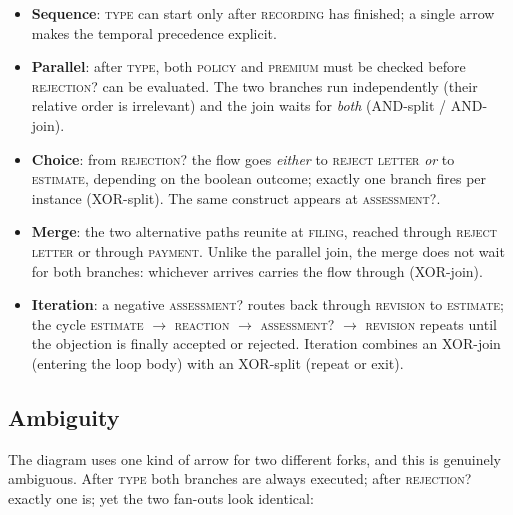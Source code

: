 \begin{itemize}
  \item \textbf{Sequence}: \textsc{type} can start only after \textsc{recording} has finished; a single arrow makes the temporal precedence explicit.
  \item \textbf{Parallel}: after \textsc{type}, both \textsc{policy} and \textsc{premium} must be checked before \textsc{rejection?} can be evaluated. The two branches run independently (their relative order is irrelevant) and the join waits for \emph{both} (AND-split / AND-join).
  \item \textbf{Choice}: from \textsc{rejection?} the flow goes \emph{either} to \textsc{reject letter} \emph{or} to \textsc{estimate}, depending on the boolean outcome; exactly one branch fires per instance (XOR-split). The same construct appears at \textsc{assessment?}.
  \item \textbf{Merge}: the two alternative paths reunite at \textsc{filing}, reached through \textsc{reject letter} or through \textsc{payment}. Unlike the parallel join, the merge does not wait for both branches: whichever arrives carries the flow through (XOR-join).
  \item \textbf{Iteration}: a negative \textsc{assessment?} routes back through \textsc{revision} to \textsc{estimate}; the cycle \textsc{estimate} $\rightarrow$ \textsc{reaction} $\rightarrow$ \textsc{assessment?} $\rightarrow$ \textsc{revision} repeats until the objection is finally accepted or rejected. Iteration combines an XOR-join (entering the loop body) with an XOR-split (repeat or exit).
\end{itemize}

\subsection{Ambiguity}

The diagram uses one kind of arrow for two different forks, and this is genuinely ambiguous. After \textsc{type} both branches are always executed; after \textsc{rejection?} exactly one is; yet the two fan-outs look identical:

\begin{center}
\end{center}

